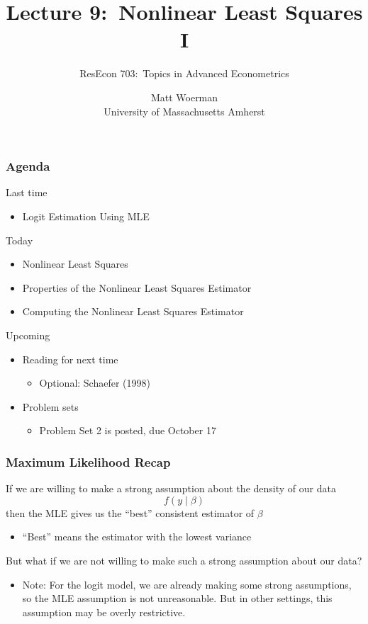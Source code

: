 \documentclass{beamer}
\title[Lecture 9:\ Nonlinear Least Squares I]{Lecture 9:\ Nonlinear Least Squares I}
\author[ResEcon 703:\ Advanced Econometrics]{ResEcon 703:\ Topics in Advanced Econometrics}
\date{Matt Woerman\\University of Massachusetts Amherst}
\begin{document}
{ 
\begin{frame}[noframenumbering]
    \titlepage
\end{frame}
}

\begin{frame}\frametitle{Agenda}
    Last time
    \begin{itemize}
        \item Logit Estimation Using MLE
    \end{itemize}
    \vspace{2ex}
    Today
    \begin{itemize}
    	\item Nonlinear Least Squares
    	\item Properties of the Nonlinear Least Squares Estimator
    	\item Computing the Nonlinear Least Squares Estimator
    \end{itemize}
    \vspace{2ex}
    Upcoming
    \begin{itemize}
        \item Reading for next time
        \begin{itemize}
            \item Optional: Schaefer (1998)
        \end{itemize}
        \item Problem sets
        \begin{itemize}
            \item Problem Set 2 is posted, due October 17
        \end{itemize}
    \end{itemize}
\end{frame}

\begin{frame}\frametitle{Maximum Likelihood Recap}
    If we are willing to make a strong assumption about the density of our data 
    $$f(y \mid \beta)$$
    then the MLE gives us the ``best'' consistent estimator of $\beta$
    \begin{itemize}
    	\item ``Best'' means the estimator with the lowest variance
    \end{itemize}
    \vspace{3ex}
    But what if we are not willing to make such a strong assumption about our data?
    \begin{itemize}
    	\item Note: For the logit model, we are already making some strong assumptions, so the MLE assumption is not unreasonable. But in other settings, this assumption may be overly restrictive.
    \end{itemize}
 \end{frame}
\end{document}
